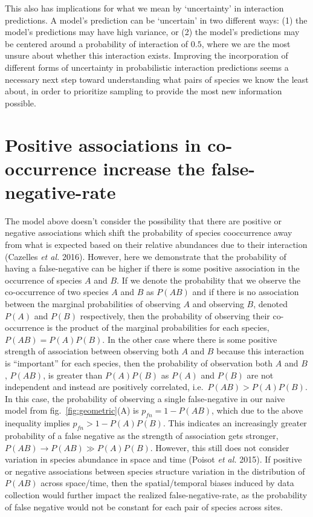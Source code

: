 \documentclass[11pt]{article}
\begin{document}
This also has implications for what we mean by `uncertainty' in
interaction predictions. A model's prediction can be `uncertain' in two
different ways: (1) the model's predictions may have high variance, or
(2) the model's predictions may be centered around a probability of
interaction of \(0.5\), where we are the most unsure about whether this
interaction exists. Improving the incorporation of different forms of
uncertainty in probabilistic interaction predictions seems a necessary
next step toward understanding what pairs of species we know the least
about, in order to prioritize sampling to provide the most new
information possible.

\hypertarget{positive-associations-in-co-occurrence-increase-the-false-negative-rate}{%
\section{Positive associations in co-occurrence increase the
false-negative-rate}\label{positive-associations-in-co-occurrence-increase-the-false-negative-rate}}

The model above doesn't consider the possibility that there are positive
or negative associations which shift the probability of species
cooccurrence away from what is expected based on their relative
abundances due to their interaction (Cazelles \emph{et al.} 2016).
However, here we demonstrate that the probability of having a
false-negative can be higher if there is some positive association in
the occurrence of species \(A\) and \(B\). If we denote the probability
that we observe the co-occurrence of two species \(A\) and \(B\) as
\(P(AB)\) and if there is no association between the marginal
probabilities of observing \(A\) and observing \(B\), denoted \(P(A)\)
and \(P(B)\) respectively, then the probability of observing their
co-occurrence is the product of the marginal probabilities for each
species, \(P(AB) = P(A)P(B)\). In the other case where there is some
positive strength of association between observing both \(A\) and \(B\)
because this interaction is ``important'' for each species, then the
probability of observation both \(A\) and \(B\), \(P(AB)\), is greater
than \(P(A)P(B)\) as \(P(A)\) and \(P(B)\) are not independent and
instead are positively correlated, i.e.~\(P(AB)> P(A)P(B)\). In this
case, the probability of observing a single false-negative in our naive
model from fig.~\ref{fig:geometric}(A) is \(p_{fn}= 1-P(AB)\), which due
to the above inequality implies \(p_{fn}>1-P(A)P(B)\). This indicates an
increasingly greater probability of a false negative as the strength of
association gets stronger, \(P(AB) \to P(AB) \gg P(A)P(B)\). However,
this still does not consider variation in species abundance in space and
time (Poisot \emph{et al.} 2015). If positive or negative associations
between species structure variation in the distribution of \(P(AB)\)
across space/time, then the spatial/temporal biases induced by data
collection would further impact the realized false-negative-rate, as the
probability of false negative would not be constant for each pair of
species across sites.
\end{document}
